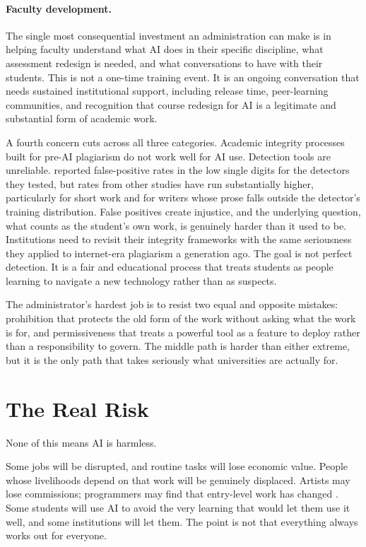 \documentclass[12pt]{article}
\begin{document}
\paragraph{Faculty development.} The single most consequential investment an administration can make is in helping faculty understand what AI does in their specific discipline, what assessment redesign is needed, and what conversations to have with their students. This is not a one-time training event. It is an ongoing conversation that needs sustained institutional support, including release time, peer-learning communities, and recognition that course redesign for AI is a legitimate and substantial form of academic work.

A fourth concern cuts across all three categories. Academic integrity processes built for pre-AI plagiarism do not work well for AI use. Detection tools are unreliable. \citet{hyatt2025aggregated} reported false-positive rates in the low single digits for the detectors they tested, but rates from other studies have run substantially higher, particularly for short work and for writers whose prose falls outside the detector's training distribution. False positives create injustice, and the underlying question, what counts as the student's own work, is genuinely harder than it used to be. Institutions need to revisit their integrity frameworks with the same seriousness they applied to internet-era plagiarism a generation ago. The goal is not perfect detection. It is a fair and educational process that treats students as people learning to navigate a new technology rather than as suspects.

The administrator's hardest job is to resist two equal and opposite mistakes: prohibition that protects the old form of the work without asking what the work is for, and permissiveness that treats a powerful tool as a feature to deploy rather than a responsibility to govern. The middle path is harder than either extreme, but it is the only path that takes seriously what universities are actually for.

\section{The Real Risk}

None of this means AI is harmless.

Some jobs will be disrupted, and routine tasks will lose economic value. People whose livelihoods depend on that work will be genuinely displaced. Artists may lose commissions; programmers may find that entry-level work has changed \citep{dellacqua2023navigating}. Some students will use AI to avoid the very learning that would let them use it well, and some institutions will let them. The point is not that everything always works out for everyone.
\end{document}
